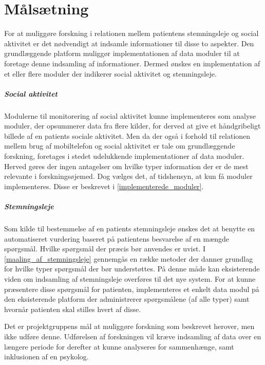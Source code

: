 \chapter{Målsætning}\label{problem}
For at muliggøre forskning i relationen mellem patientens stemningsleje og social aktivitet er det nødvendigt at indsamle informationer til disse to aspekter.
Den grundlæggende platform muliggør implementationen af data moduler  til at foretage denne indsamling af informationer.
Dermed ønskes en implementation af et eller flere moduler der indikerer social aktivitet og stemningsleje.

\paragraph{Social aktivitet}
Modulerne til monitorering af social aktivitet kunne implementeres som analyse moduler, der opsummerer data fra flere kilder, for derved at give et håndgribeligt billede af en patients sociale aktivitet.
Men da der også i forhold til relationen mellem brug af mobiltelefon og social aktivitet er tale om grundlæggende forskning, foretages i stedet udelukkende implementationer af data moduler.
Herved gøres der ingen antagelser om hvilke typer information der er de mest relevante i forskningsøjemed.
Dog vælges det, af tidshensyn, at kun få moduler implementeres.
Disse er beskrevet i \cref{implementerede_moduler}.

\paragraph{Stemningsleje}
Som kilde til bestemmelse af en patients stemningsleje ønskes det at benytte en automatiseret vurdering baseret på patientens besvarelse af en mængde spørgsmål.
Hvilke spørgsmål der præcis bør anvendes er uvist.
I \cref{maaling_af_stemningsleje} gennemgås en række metoder der danner grundlag for hvilke typer spørgsmål der bør understøttes.
På denne måde kan eksisterende viden om indsamling af stemningsleje overføres til det nye system.
For at kunne præsentere disse spørgsmål for patienten, implementeres et enkelt data modul på den eksisterende platform\citefaelles{} der administrerer spørgsmålene (af alle typer) samt hvornår patienten skal stilles hvert af disse.

Det er projektgruppens mål at muliggøre forskning som beskrevet herover, men ikke udføre denne.
Udførelsen af forskningen vil kræve indsamling af data over en længere periode for derefter at kunne analyseres for sammenhænge, samt inklusionen af en psykolog.

